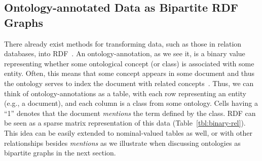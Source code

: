 \subsection{Ontology-annotated Data as Bipartite RDF Graphs}
%
There already exist methods for transforming data, such as those in relation databases, into RDF~\cite{RDB2RDF}. An ontology-annotation, as we see it, is a binary value representing whether some ontological concept (or class) is associated with some entity.  Often, this means that some concept appears in some document and thus the ontology serves to index the document with related concepts~\cite{RI}.  Thus, we can think of ontology-annotations as a table, with each row representing an entity (e.g., a document), and each column is a class from some ontology.  Cells having a ``1'' denotes that the document \emph{mentions} the term defined by the class.  RDF can be seen as a sparse matrix representation of this data (Table~\ref{tbl:binary-rel}).  This idea can be easily extended to nominal-valued tables as well, or with other relationships besides \emph{mentions} as we illustrate when discussing ontologies as bipartite graphs in the next section.
